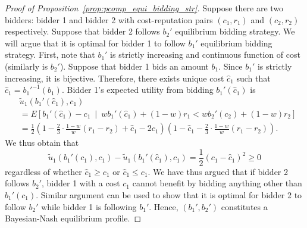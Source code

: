 \begin{proof}[Proof of Proposition~\ref{prop:pcomp_equi_bidding_str}]
Suppose there are two bidders: bidder 1 and bidder 2 with cost-reputation pairs $(c_1,r_1)$ and $(c_2,r_2)$ respectively. Suppose that bidder 2 follows $b_2'$ equilibrium bidding strategy. We will argue that it is optimal for bidder 1 to follow $b_1'$ equilibrium bidding strategy. First, note that $b_1'$ is strictly increasing and continuous function of cost (similarly is $b_2'$). Suppose that bidder 1 bids an amount $b_1$. Since $b_1'$ is strictly increasing, it is bijective. Therefore, there exists unique cost $\hat{c}_1$ such that $\hat{c}_1 = {b_1'}^{-1}(b_1)$. Bidder 1's expected utility from bidding $b_1'(\hat{c}_1)$ is
\begin{align*}
	&\tilde{u}_1(b_1'(\hat{c}_1), c_1) \\
	&= E \left[ b_1'(\hat{c}_1) - c_1 \:\middle\vert\: wb_1'(\hat{c}_1) + (1-w)r_1 < wb_2'(c_2) + (1-w)r_2 \right] \\
	&= \frac{1}{2} \left( 1 - \frac{2}{3}\cdot\frac{1-w}{w}(r_1-r_2) + \hat{c}_1 - 2c_1 \right) \left( 1 - \hat{c}_1 - \frac{2}{3}\cdot\frac{1-w}{w}(r_1-r_2) \right).
\end{align*}
We thus obtain that
\begin{equation*}
	\tilde{u}_1(b_1'(c_1), c_1) - \tilde{u}_1(b_1'(\hat{c}_1), c_1) = \frac{1}{2}(c_1-\hat{c}_1)^2 \ge 0
\end{equation*}
regardless of whether $\hat{c}_1\ge c_1$ or $\hat{c}_1 \le c_1$. We have thus argued that if bidder 2 follows $b_2'$, bidder 1 with a cost $c_1$ cannot benefit by bidding anything other than $b_1'(c_1)$. Similar argument can be used to show that it is optimal for bidder 2 to follow $b_2'$ while bidder 1 is following $b_1'$. Hence, $(b_1',b_2')$ constitutes a Bayesian-Nash equilibrium profile.
\end{proof}

